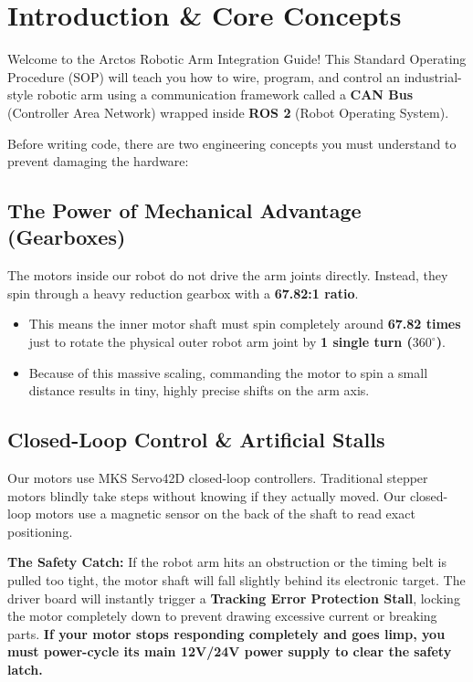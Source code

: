 \documentclass[11pt,letterpaper]{article}
\begin{document}
\section{Introduction \& Core Concepts}
Welcome to the Arctos Robotic Arm Integration Guide! This Standard Operating Procedure (SOP) will teach you how to wire, program, and control an industrial-style robotic arm using a communication framework called a \textbf{CAN Bus} (Controller Area Network) wrapped inside \textbf{ROS 2} (Robot Operating System).

Before writing code, there are two engineering concepts you must understand to prevent damaging the hardware:

\subsection{The Power of Mechanical Advantage (Gearboxes)}
The motors inside our robot do not drive the arm joints directly. Instead, they spin through a heavy reduction gearbox with a \textbf{67.82:1 ratio}. 
\begin{itemize}
    \item This means the inner motor shaft must spin completely around \textbf{67.82 times} just to rotate the physical outer robot arm joint by \textbf{1 single turn ($360^\circ$)}.
    \item Because of this massive scaling, commanding the motor to spin a small distance results in tiny, highly precise shifts on the arm axis.
\end{itemize}

\subsection{Closed-Loop Control \& Artificial Stalls}
Our motors use MKS Servo42D closed-loop controllers. Traditional stepper motors blindly take steps without knowing if they actually moved. Our closed-loop motors use a magnetic sensor on the back of the shaft to read exact positioning. 

\textbf{The Safety Catch:} If the robot arm hits an obstruction or the timing belt is pulled too tight, the motor shaft will fall slightly behind its electronic target. The driver board will instantly trigger a \textbf{Tracking Error Protection Stall}, locking the motor completely down to prevent drawing excessive current or breaking parts. \textbf{If your motor stops responding completely and goes limp, you must power-cycle its main 12V/24V power supply to clear the safety latch.}
\end{document}
